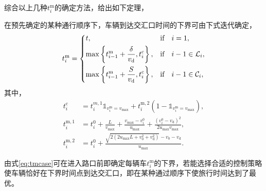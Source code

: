 综合以上几种$t_i^\mathrm{m}$的确定方法，给出如下定理，
\begin{theorem}
在预先确定的某种通行顺序下，车辆到达交汇口时间的下界可由下式迭代确定，
\begin{equation}
t_i^\mathrm{m}=
\begin{dcases}
t, & \text{if}\quad i=1,\\
\max \left\{t_{i-1}^\mathrm{m} + \frac{\delta}{v_\mathrm{d}}, t_i^\mathrm{c}\right\}, & \text{if}\quad i-1\in \mathcal{L}_i,\\
\max \left\{t_{i-1}^\mathrm{m} + \frac{S}{v_\mathrm{d}}, t_i^\mathrm{c}\right\}, & \text{if}\quad i-1\in \mathcal{C}_i,
\end{dcases}
\label{eq:tmcase}
\end{equation}
其中，
\begin{align}
t_i^\mathrm{c}&=t_i^{m,1}\mathds{1}_{v_i^\mathrm{m}=v_{\max}}+t_i^\mathrm{m,2}(1-\mathds{1}_{v_i^\mathrm{m}=v_{\max}}),\\
t_i^\mathrm{m,1}&=t_i^0 + \frac{L}{v_{\max}} + \frac{v_{\max}-v_i^0}{u_{\max}} + \frac{(v_i^0-v_\mathrm{d})^2}{2u_{\max}v_{\max}},\\
t_i^\mathrm{m,2}&=t_i^0+\frac{\sqrt{2(2u_{\max}L+v_0^2+v_\mathrm{d}^2)}-v_0-v_\mathrm{d}}{u_{\max}}.
\end{align}
\end{theorem}

由式\eqref{eq:tmcase}可在进入路口前即确定每辆车$t_i^\mathrm{m}$的下界，若能选择合适的控制策略使车辆恰好在下界时间点到达交汇口，即在某种通过顺序下使旅行时间达到了最优。

